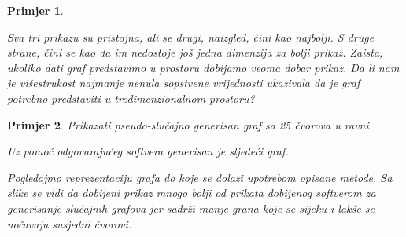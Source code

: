 \documentclass[11pt]{article}
\newtheorem{example}{Primjer}
\begin{document}
\begin{example}
        \begin{figure}[h]
            \centering
			\hfill
        \end{figure}

        Sva tri prikazu su pristojna, ali se drugi, naizgled, čini kao najbolji.
        S druge strane, čini se kao da im nedostoje još jedna dimenzija za bolji prikaz.
		Zaista, ukoliko dati graf predstavimo u prostoru dobijamo veoma dobar prikaz.
        Da li nam je višestrukost najmanje nenula sopstvene vrijednosti ukazivala da je graf potrebno predstaviti u trodimenzionalnom prostoru?
        
    \end{example}
    
    \begin{example}
        Prikazati pseudo-slučajno generisan graf sa 25 čvorova u ravni.

        Uz pomoć odgovarajućeg softvera generisan je sljedeći graf.
        \begin{figure}[h]
            \centering
			\hfill
        \end{figure}
        
        Pogledajmo reprezentaciju grafa do koje se dolazi upotrebom opisane metode. 
		Sa slike se vidi da dobijeni prikaz mnogo bolji od prikata dobijenog softverom za generisanje slučajnih grafova jer sadrži manje grana koje se sijeku i lakše se uočavaju susjedni čvorovi.
    \end{example}
	
\end{document}
